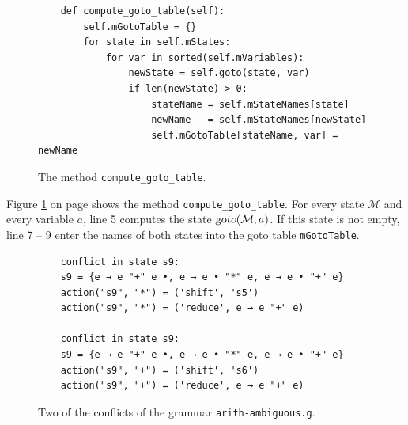 \begin{figure}[!ht]
\centering
\begin{verbatim}
    def compute_goto_table(self):
        self.mGotoTable = {}
        for state in self.mStates:
            for var in sorted(self.mVariables):
                newState = self.goto(state, var)
                if len(newState) > 0:
                    stateName = self.mStateNames[state]
                    newName   = self.mStateNames[newState]
                    self.mGotoTable[stateName, var] = newName
\end{verbatim}
\vspace*{-0.3cm}
\caption{The method \texttt{compute\_goto\_table}.}
\label{fig:04-SLR-Table-Generator.ipynb:compute_goto_table}
\end{figure}

\noindent
Figure \ref{fig:04-SLR-Table-Generator.ipynb:compute_goto_table} on page
\pageref{fig:04-SLR-Table-Generator.ipynb:compute_goto_table} shows the method \texttt{compute\_goto\_table}.  For
every state $\mathcal{M}$ and every variable $a$, line 5 computes the state $\textsl{goto}(\mathcal{M}, a)$.  If
this state is not empty, line 7 -- 9 enter the names of both states into the goto table \texttt{mGotoTable}.

\begin{figure}[!ht]
\centering
\begin{verbatim}
    conflict in state s9:
    s9 = {e → e "+" e •, e → e • "*" e, e → e • "+" e}
    action("s9", "*") = ('shift', 's5')
    action("s9", "*") = ('reduce', e → e "+" e)

    conflict in state s9:
    s9 = {e → e "+" e •, e → e • "*" e, e → e • "+" e}
    action("s9", "+") = ('shift', 's6')
    action("s9", "+") = ('reduce', e → e "+" e)
\end{verbatim}
\vspace*{-0.3cm}
\caption{Two of the conflicts of the grammar \texttt{arith-ambiguous.g}.}
\label{fig:04-SLR-Table-Generator.ipynb:conflicts}
\end{figure}

